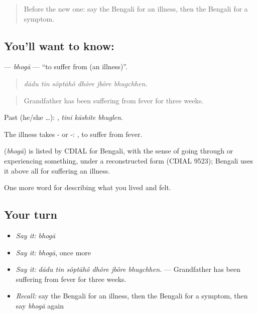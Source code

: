 \label{lesson:BN-C471-bhoga}



\begin{quote}
Before the new one: say the Bengali for an illness, then the Bengali for a symptom.
\end{quote}

\subsection*{You'll want to know: }
\textbf{} — \emph{bhogā} — \textquotedblleft{}to suffer from (an illness)\textquotedblright{}.

\begin{quote}
     
\end{quote}

\begin{quote}
\emph{dādu tin sôptāhô dhôre jbôre bhugchhen.}
\end{quote}

\begin{quote}
Grandfather has been suffering from fever for three weeks.
\end{quote}

Past (he/she …):   , \emph{tini kāshite bhuglen}.

The illness takes - or -:  , to suffer from fever.

\begin{cousinweb}
\textbf{} (\emph{bhogā}) is listed by CDIAL for Bengali, with the sense of going through or experiencing something, under a reconstructed form (CDIAL 9523); Bengali uses it above all for suffering an illness.
\end{cousinweb}

\begin{grammarlens}[title={What you've built}]
One more word for describing what you lived and felt.
\end{grammarlens}

\subsection*{Your turn}
\begin{itemize}
\raggedright
  \item \emph{Say it:} \emph{bhogā}
  \item \emph{Say it:} \emph{bhogā}, once more
  \item \emph{Say it:} \emph{dādu tin sôptāhô dhôre jbôre bhugchhen.} — Grandfather has been suffering from fever for three weeks.
  \item \emph{Recall:} say the Bengali for an illness, then the Bengali for a symptom, then say \emph{bhogā} again
\end{itemize}

